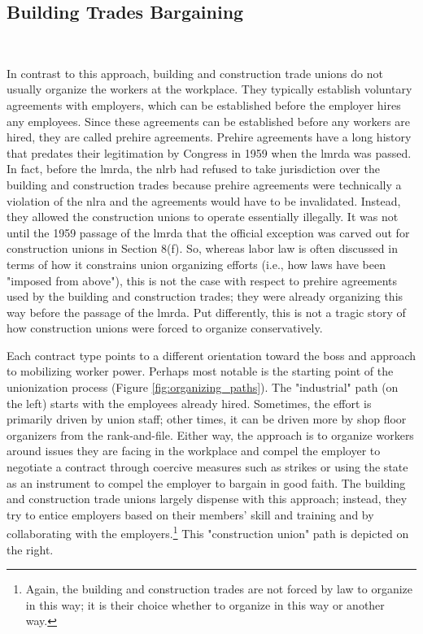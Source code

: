 \documentclass[12pt]{article}
\begin{document}
\subsection{Building Trades Bargaining}\label{bt_bargaining}\

In contrast to this approach, building and construction trade unions do not usually organize the workers at the workplace. They typically establish voluntary agreements with employers, which can be established before the employer hires any employees. Since these agreements can be established before any workers are hired, they are called prehire agreements. Prehire agreements have a long history that predates their legitimation by Congress in 1959 when the \acrfull{lmrda} was passed. In fact, before the \acrshort{lmrda}, the \acrshort{nlrb} had refused to take jurisdiction over the building and construction trades because prehire agreements were technically a violation of the \acrshort{nlra} and the agreements would have to be invalidated. Instead, they allowed the construction unions to operate essentially illegally. It was not until the 1959 passage of the \acrshort{lmrda} that the official exception was carved out for construction unions in Section 8(f). So, whereas labor law is often discussed in terms of how it constrains union organizing efforts (i.e., how laws have been "imposed from above"), this is not the case with respect to prehire agreements used by the building and construction trades; they were already organizing this way before the passage of the \acrshort{lmrda}. Put differently, this is not a tragic story of how construction unions were forced to organize conservatively.

Each contract type points to a different orientation toward the boss and approach to mobilizing worker power. Perhaps most notable is the starting point of the unionization process (Figure \ref{fig:organizing_paths}). The "industrial" path (on the left) starts with the employees already hired. Sometimes, the effort is primarily driven by union staff; other times, it can be driven more by shop floor organizers from the rank-and-file. Either way, the approach is to organize workers around issues they are facing in the workplace and compel the employer to negotiate a contract through coercive measures such as strikes or using the state as an instrument to compel the employer to bargain in good faith. The building and construction trade unions largely dispense with this approach; instead, they try to entice employers based on their members’ skill and training and by collaborating with the employers.\footnote{Again, the building and construction trades are not forced by law to organize in this way; it is their choice whether to organize in this way or another way.} This "construction union" path is depicted on the right.
\end{document}
